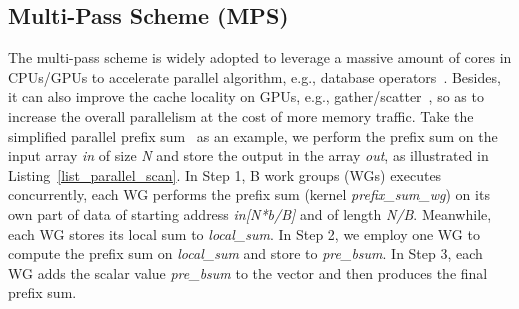 \subsection{Multi-Pass Scheme (MPS)}
The multi-pass scheme is widely adopted to leverage a massive amount of cores in CPUs/GPUs to accelerate parallel algorithm, e.g., database operators~\cite{query_gpu_tods09, omnidb_vldb13, query_openCL_fpga_fpl16}. Besides, it can also improve the cache locality on GPUs, e.g., gather/scatter~\cite{gather_scatter_sc07}, so as to increase the overall parallelism at the cost of more memory traffic. Take the simplified parallel prefix sum~\cite{scan_gpu_nvidia07} as an example, we perform the prefix sum on the input array \emph{in} of size \emph{N} and store the output in the array \emph{out}, as illustrated in Listing~\ref{list_parallel_scan}. In Step 1, B work groups (WGs) executes concurrently, each WG performs the prefix sum (kernel \emph{prefix\_sum\_wg}) on its own part of data of starting address \emph{in[N*b/B]} and of length \emph{N/B}. Meanwhile, each WG stores its local sum to \emph{local\_sum}. In Step 2, we employ one WG to compute the prefix sum on \emph{local\_sum} and store to \emph{pre\_bsum}. In Step 3, each WG adds the scalar value \emph{pre\_bsum} to the vector and then produces the final prefix sum. 



